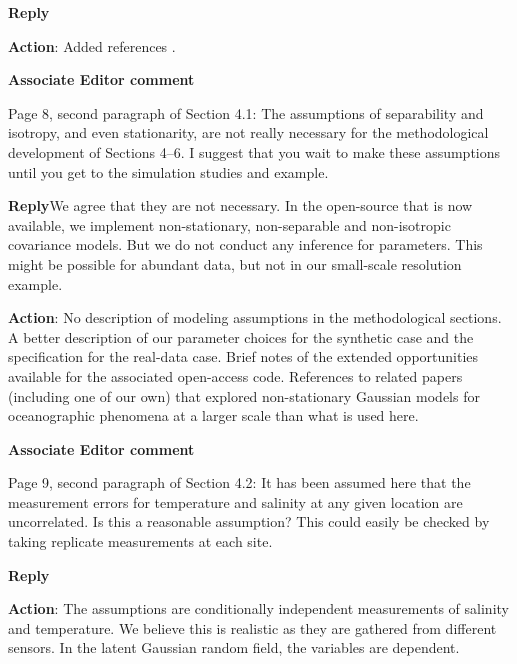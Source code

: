 \documentclass[a4paper]{article}
\def\aecom{\textbf{Associate Editor comment}}
\def\reply{\textbf{Reply}}
\def\action{\textbf{Action}}
\begin{document}
\reply 

\action: Added references \cite{adler2000excursion,adler2009random}.

\vspace{1em}

\vspace{5mm}
\noindent \aecom 

Page 8, second paragraph of Section 4.1: The assumptions of separability and isotropy, and even stationarity, are not really necessary for the methodological development of Sections 4–6. I suggest that you wait to make these assumptions until you get to the simulation studies and example.\par

\reply We agree that they are not necessary. In the open-source that is now available, we implement non-stationary, non-separable and non-isotropic covariance models. But we do not conduct any inference for parameters. This might be possible for abundant data, but not in our small-scale resolution example. 

\action: No description of modeling assumptions in the methodological sections. A better description of our parameter choices for the synthetic case and the specification for the real-data case. Brief notes of the extended opportunities available for the associated open-access code. References to related papers (including one of our own) that explored non-stationary Gaussian models for oceanographic phenomena at a larger scale than what is used here. 

\vspace{1em}

\vspace{5mm}
\noindent \aecom 

Page 9, second paragraph of Section 4.2: It has been assumed here that the measurement errors for temperature and salinity at any given location are uncorrelated. Is this a reasonable assumption? This could easily be checked by taking replicate measurements at each site.\par

\reply 

\action: The assumptions are conditionally independent measurements of salinity and temperature. We believe this is realistic as they are gathered from different sensors. In the latent Gaussian random field, the variables are dependent. 
\vspace{1em}
\end{document}
